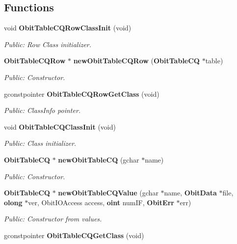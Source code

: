 \subsection*{Functions}
\begin{CompactItemize}
\item 
void {\bf Obit\-Table\-CQRow\-Class\-Init} (void)
\begin{CompactList}\small\item\em Public: Row Class initializer. \item\end{CompactList}\item 
{\bf Obit\-Table\-CQRow} $\ast$ {\bf new\-Obit\-Table\-CQRow} ({\bf Obit\-Table\-CQ} $\ast$table)
\begin{CompactList}\small\item\em Public: Constructor. \item\end{CompactList}\item 
gconstpointer {\bf Obit\-Table\-CQRow\-Get\-Class} (void)
\begin{CompactList}\small\item\em Public: Class\-Info pointer. \item\end{CompactList}\item 
void {\bf Obit\-Table\-CQClass\-Init} (void)
\begin{CompactList}\small\item\em Public: Class initializer. \item\end{CompactList}\item 
{\bf Obit\-Table\-CQ} $\ast$ {\bf new\-Obit\-Table\-CQ} (gchar $\ast$name)
\begin{CompactList}\small\item\em Public: Constructor. \item\end{CompactList}\item 
{\bf Obit\-Table\-CQ} $\ast$ {\bf new\-Obit\-Table\-CQValue} (gchar $\ast$name, {\bf Obit\-Data} $\ast$file, {\bf olong} $\ast$ver, Obit\-IOAccess access, {\bf oint} num\-IF, {\bf Obit\-Err} $\ast$err)
\begin{CompactList}\small\item\em Public: Constructor from values. \item\end{CompactList}\item 
gconstpointer {\bf Obit\-Table\-CQGet\-Class} (void)

\end{CompactItemize}

